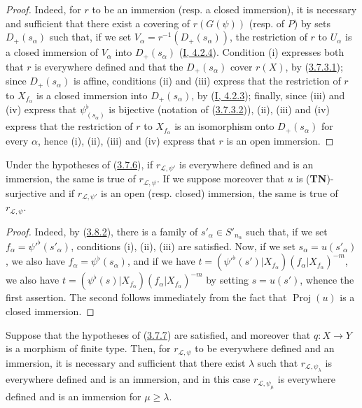 \begin{proof}
Indeed, for $r$ to be an immersion (resp. a closed immersion), it is
necessary and sufficient that there exist a covering of $r(G(\psi))$ (resp. of
$P$) by sets $D_+(s_\alpha)$ such that, if we set
$V_\alpha=r^{-1}(D_+(s_\alpha))$, the restriction of $r$ to $U_\alpha$ is
a closed immersion of $V_\alpha$ into $D_+(s_\alpha)$
(\hyperref[I.4.2.4]{I, 4.2.4}). Condition (i) expresses both that
$r$ is everywhere defined and that the $D_+(s_\alpha)$ cover $r(X)$,
by (\hyperref[II.3.7.3.1]{3.7.3.1}); since $D_+(s_\alpha)$ is
affine, conditions (ii) and (iii) express that the restriction of $r$ to
$X_{f_\alpha}$ is a closed immersion into $D_+(s_\alpha)$, by
(\hyperref[I.4.2.3]{I, 4.2.3}); finally, since (iii) and (iv) express that
$\psi_{(s_\alpha)}^\flat$ is bijective (notation of
(\hyperref[II.3.7.3.2]{3.7.3.2})), (ii), (iii) and (iv) express that the
restriction of $r$ to $X_{f_\alpha}$ is an isomorphism onto
$D_+(s_\alpha)$ for every $\alpha$, hence (i), (ii), (iii) and (iv) express
that $r$ is an open immersion.
\end{proof}

\begin{corollary}[3.8.3]
\label{II.3.8.3}
Under the hypotheses of (\hyperref[II.3.7.6]{3.7.6}), if
$r_{\mathcal{L},\psi'}$ is everywhere defined and is an immersion, the same is
true of $r_{\mathcal{L},\psi}$. If we suppose moreover that $u$ is
(\textbf{TN})-surjective and if $r_{\mathcal{L},\psi'}$ is an open (resp.
closed) immersion, the same is true of $r_{\mathcal{L},\psi}$.
\end{corollary}

\begin{proof}
Indeed, by (\hyperref[II.3.8.2]{3.8.2}), there is a family of
$s'_\alpha\in S'_{n_\alpha}$ such that, if we set
$f_\alpha=\psi'^\flat(s'_\alpha)$, conditions (i), (ii), (iii) are
satisfied. Now, if we set $s_\alpha=u(s'_\alpha)$, we also have
$f_\alpha=\psi^\flat(s_\alpha)$, and if we have
$t=(\psi'^\flat(s')|X_{f_\alpha})(f_\alpha|X_{f_\alpha})^{-m}$, we also have
$t=(\psi^\flat(s)|X_{f_\alpha})(f_\alpha|X_{f_\alpha})^{-m}$ by setting
$s=u(s')$, whence the first assertion. The second follows immediately from
the fact that $\operatorname{Proj}(u)$ is a closed immersion.
\end{proof}

\begin{proposition}[3.8.4]
\label{II.3.8.4}
Suppose that the hypotheses of
(\hyperref[II.3.7.7]{3.7.7}) are satisfied, and moreover that $q:X\to Y$ is a
morphism of finite type. Then, for $r_{\mathcal{L},\psi}$ to be everywhere
defined and an immersion, it is necessary and sufficient that there exist
$\lambda$ such that $r_{\mathcal{L},\psi_\lambda}$ is everywhere defined and
is an immersion, and in this case $r_{\mathcal{L},\psi_\mu}$ is everywhere
defined and is an immersion for $\mu\geq\lambda$.
\end{proposition}

